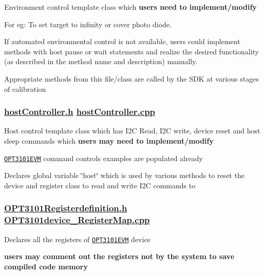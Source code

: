 \begin{DoxyItemize}
\item Environment control template class which {\bfseries users need to implement/modify}
\item For eg\+: To set target to infinity or cover photo diode.
\item If automated environmental control is not available, users could implement methods with host pause or wait statements and realize the desired functionality (as described in the method name and description) manually.
\item Appropriate methods from this file/class are called by the S\+DK at various stages of calibration
\end{DoxyItemize}

\subsubsection*{\mbox{\hyperlink{host_controller_8h}{host\+Controller.\+h}} \mbox{\hyperlink{host_controller_8cpp}{host\+Controller.\+cpp}}}


\begin{DoxyItemize}
\item Host control template class which has I2C Read, I2C write, device reset and host sleep commands which {\bfseries users may need to implement/modify}
\item \href{http://www.ti.com/tool/OPT3101EVM}{\tt O\+P\+T3101\+E\+VM} command controls examples are populated already
\item Declares global variable \char`\"{}host\char`\"{} which is used by various methods to reset the device and register class to read and write I2C commands to
\end{DoxyItemize}

\subsubsection*{\mbox{\hyperlink{_o_p_t3101_register_definition_8h}{O\+P\+T3101\+Registerdefinition.\+h}} \mbox{\hyperlink{_o_p_t3101device___register_map_8cpp}{O\+P\+T3101device\+\_\+\+Register\+Map.\+cpp}}}


\begin{DoxyItemize}
\item Declares all the registers of \href{http://www.ti.com/tool/OPT3101EVM}{\tt O\+P\+T3101\+E\+VM} device
\item {\bfseries users may comment out the registers not by the system to save compiled code memory}
\end{DoxyItemize}

